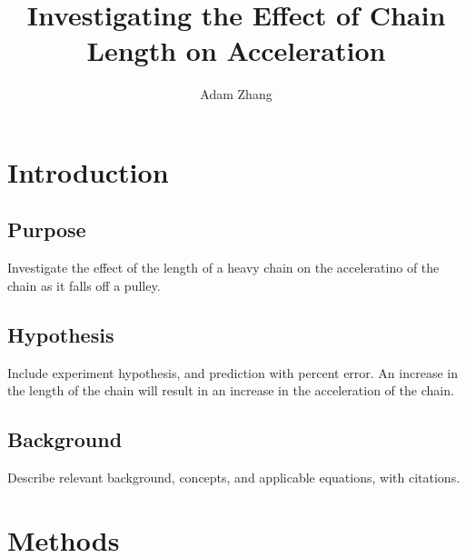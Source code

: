 \documentclass[stu,biblatex,floatsintext,draftall]{apa7}
\title{Investigating the Effect of Chain Length on Acceleration}
\author{Adam Zhang}
\affiliation{Academies of Loudoun}
\begin{document}
\maketitle
\tableofcontents
\newpage

\section{Introduction}

\subsection{Purpose}
Investigate the effect of the length of a heavy chain on the acceleratino of the chain as it falls off a pulley.

\subsection{Hypothesis}
Include experiment hypothesis, and prediction with percent error.
An increase in the length of the chain will result in an increase in the acceleration of the chain.

\subsection{Background}
Describe relevant background, concepts, and applicable equations, with citations.

\section{Methods}
\end{document}
